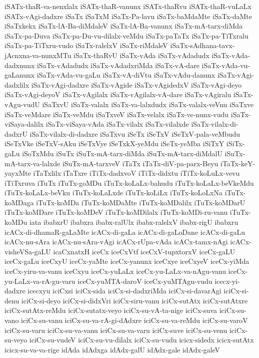 {iSATx-thaR-va-nenxlalx
iSATx-thaR-vanunx
iSATx-thaRvu
iSATx-thaR-vuLaLx
iSATx-vAgi-dadxre
iSaTx
iSaTxM
iSaTx-Pa-lavu
iSaTx-baMdaMte
iSaTx-daMte
iSaTxkekx
iSaTx-lA-Ba-diMdaleV
iSaTx-lA-Ba-vanunx
iSaTx-mA-tarx-diMda
iSaTx-pa-Duva
iSaTx-pa-Du-vu-dilalx-veMdu
iSaTx-paTaTx
iSaTx-pa-TiTxralu
iSaTx-pa-TiTxru-vudo
iSaTx-ralelxV
iSaTx-riMdaleV
iSaTx-sAdhana-tavx-jAcnxna-va-nunxMTu
iSaTx-thaRvU
iSaTx-vAda
iSaTx-vAdadudx
iSaTx-vAda-dadxnunx
iSaTx-vAdadudx
iSaTx-vAdadxriMda
iSaTx-vA-dare
iSaTx-vAda-vu-gaLanunx
iSaTx-vAda-vu-gaLu
iSaTx-vA-diVtu
iSaTx-vAdu-danunx
iSaTx-vAgi-dadxlilx
iSaTx-vAgi-dadxre
iSaTx-vAgide
iSaTx-vAgidedxV
iSaTx-vAgi-deyo
iSaTx-vAgi-deyoV
iSaTx-vAgilalx
iSaTx-vAgilalx-vA-dare
iSaTx-vAgiralu
iSaTx-vAgu-vudU
iSaTxvU
iSaTx-valalx
iSaTx-va-lalxdudx
iSaTx-valalx-veVnu
iSaTxve
iSaTx-veMdare
iSaTx-veMdu
iSaTxveV
iSaTx-velalx
iSaTx-ve-nunx-vudu
iSaTx-viSaya-dalilx
iSaTx-viSaya-vAda
iSaTx-vilalx
iSaTx-vilalxde
iSaTx-vilalx-di-dadxrU
iSaTx-vilalx-di-dadxre
iSaTxvu
iSeTx
iSeTxV
iSeTxV-pala-veMbudu
iSeTxVke
iSeTxV-sAku
iSeTxVye
iSeTxkX-yeMdu
iSeTx-yeMba
iSiTxY
iSiTx-gaLu
iSoTxMdu
iSuTx
iSuTx-mA-tarx-diMda
iSuTx-mA-tarx-diMdalU
iSuTx-mA-tarx-va-lalxde
iSuTx-mA-tarxveV
iTaTx
iTaTx-diV-pa-parx-Beyu
iTaTx-keY-yayxMte
iTaTxlilx
iTaTxre
iTiTx-dadxvoV
iTiTx-didxtu
iTiTx-koLuLx-vevu
iTiTxruva
iTuTx
iTuTx-goMDu
iTuTx-koLaLx-bahudu
iTuTx-koLaLx-beVkeMdu
iTuTx-koLaLx-beVku
iTuTx-koLaLxde
iTuTx-koLiLx
iTuTx-koLoLxNa
iTuTx-koMDaga
iTuTx-koMDa
iTuTx-koMDaMte
iTuTx-koMDalilx
iTuTx-koMDarU
iTuTx-koMDare
iTuTx-koMDeV
iTuTx-koMDilalx
iTuTx-koMDi-ru-vanu
iTuTx-koMDu
iata
ibabxrU
ibabxra
ibabx-ralUlx
ibabx-ralelxV
ibabx-rigU
ibabxru
icACx-di-dhamaR-gaLaMte
icACx-di-gaLa
icACx-di-gaLoDane
icACx-di-gaLu
icACx-nu-sAra
icACx-nu-sAra-vAgi
icACx-rUpa-vAda
icACx-tamx-nAgi
icACx-visheVSa-gaLU
icaCxnatxH
iceCx
iceCxVtf
iceCxV-tupxtorxV
iceCx-gaLU
iceCx-gaLu
iceCxyU
iceCx-yaMte
iceCx-yanunx
iceCxye
iceCxyeV
iceCx-yiMda
iceCx-yiru-va-vanu
iceCxyu
iceCx-yuLaLx
iceCx-yu-LaLx-va-nAgu-vanu
iceCx-yu-LaLx-va-rA-gu-varu
iceCx-yuMTA-daroV
iceCx-yuMTAgu-vudu
icecx-yi-dadxre
icecxyu
iciCxsi
iciCx-sida
iciCx-si-dadxriMda
iciCx-si-davarAgi
iciCx-si-denu
iciCx-si-deyo
iciCx-si-didxVri
iciCx-siru-vanu
iciCx-sutAtx
iciCx-sutAtxre
iciCx-sutAtx-reMdu
iciCx-sutatx-veyo
iciCx-su-vA-ta-nige
iciCx-suva
iciCx-su-vano
iciCx-su-vanu
iciCx-su-va-rA-gi-dAdxre
iciCx-su-va-reMdu
iciCx-su-varoV
iciCx-su-varu
iciCx-su-va-vanu
iciCx-su-va-varu
iciCx-suve
iciCx-su-venu
iciCx-su-veyo
iciCx-su-vudeV
iciCx-su-vu-dilalx
iciCx-su-vudu
icicx-sidedx
icicx-sutAtx
icicx-su-va-va-rige
idAda
idAdxga
idAdx-galU
idAdx-gale
idAdx-galeV
}
